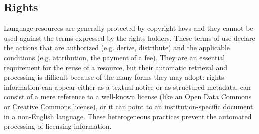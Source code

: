 \documentclass[11pt]{article}
\begin{document}
\subsection{Rights}

Language resources are generally protected by copyright laws and they cannot be
used against the terms expressed by the rights holders. These terms of use
declare the actions that are authorized (e.g. derive, distribute) and the
applicable conditions (e.g. attribution, the payment of a fee). They are an
essential requirement for the reuse of a resource, but their automatic retrieval and processing is
difficult because of the many forms they may adopt: rights information can
appear either as a textual notice or as structured metadata, can consist of a
mere reference to a well-known license (like an Open Data Commons or Creative
Commons license), or it can point to an institution-specific document in a
non-English language. These heterogeneous practices prevent the automated
processing of licensing information. 

\end{document}
